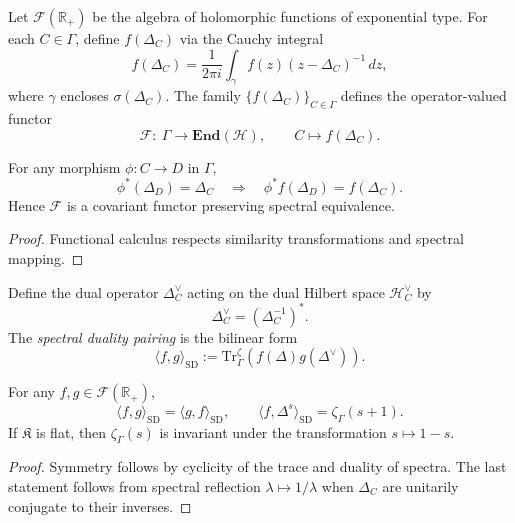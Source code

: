 \begin{definition}\label{def:functional-calculus}
Let $\mathcal F(\mathbb R_+)$ be the algebra of holomorphic functions of exponential type.
For each $C\in\Gamma$, define $f(\Delta_C)$ via the Cauchy integral
\[
f(\Delta_C)=\frac{1}{2\pi i}\int_{\gamma}f(z)(z-\Delta_C)^{-1}\,dz,
\]
where $\gamma$ encloses $\sigma(\Delta_C)$.
The family $\{f(\Delta_C)\}_{C\in\Gamma}$ defines the operator-valued functor
\[
\mathcal F:\ \Gamma\longrightarrow\mathbf{End}(\mathcal H),\qquad
C\mapsto f(\Delta_C).
\]
\end{definition}

\begin{lemma}\label{lem:functoriality}
For any morphism $\phi: C\to D$ in $\Gamma$, 
\[
\phi^\ast(\Delta_D)=\Delta_C\quad\Longrightarrow\quad
\phi^\ast f(\Delta_D)=f(\Delta_C).
\]
Hence $\mathcal F$ is a covariant functor preserving spectral equivalence.
\end{lemma}

\begin{proof}
Functional calculus respects similarity transformations and spectral mapping. \relax
\end{proof}


\begin{definition}\label{def:spectral-dual}
Define the dual operator $\Delta_C^{\vee}$ acting on the dual Hilbert space $\mathcal H_C^{\vee}$ by
\[
\Delta_C^{\vee} = (\Delta_C^{-1})^{*}.
\]
The \emph{spectral duality pairing} is the bilinear form
\[
\langle f,g\rangle_{\mathrm{SD}} := 
\mathrm{Tr}_\Gamma^{\zeta}(f(\Delta)g(\Delta^{\vee})).
\]
\end{definition}

\begin{theorem}\label{thm:spectral-duality}
For any $f,g\in\mathcal F(\mathbb R_+)$,
\[
\langle f,g\rangle_{\mathrm{SD}}=\langle g,f\rangle_{\mathrm{SD}},
\qquad
\langle f,\Delta^{s}\rangle_{\mathrm{SD}} = \zeta_\Gamma(s+1).
\]
If $\mathfrak K$ is flat, then $\zeta_\Gamma(s)$ is invariant under the transformation $s\mapsto 1-s$.
\end{theorem}

\begin{proof}
Symmetry follows by cyclicity of the trace and duality of spectra. 
The last statement follows from spectral reflection $\lambda\mapsto 1/\lambda$ when $\Delta_C$ are unitarily conjugate to their inverses. \relax
\end{proof}

